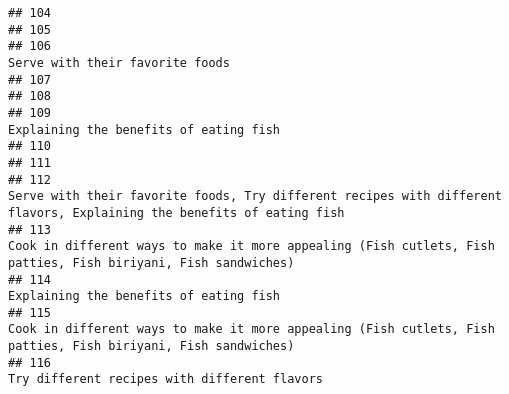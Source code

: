 \documentclass[
]{article}
\begin{document}
\begin{verbatim}
## 104                                                                                                                                                                                                             
## 105                                                                                                                                                                                                             
## 106                                                                                                                                                                              Serve with their favorite foods
## 107                                                                                                                                                                                                             
## 108                                                                                                                                                                                                             
## 109                                                                                                                                                                       Explaining the benefits of eating fish
## 110                                                                                                                                                                                                             
## 111                                                                                                                                                                                                             
## 112                                                                                        Serve with their favorite foods, Try different recipes with different flavors, Explaining the benefits of eating fish
## 113                                                                                                Cook in different ways to make it more appealing (Fish cutlets, Fish patties, Fish biriyani, Fish sandwiches)
## 114                                                                                                                                                                       Explaining the benefits of eating fish
## 115                                                                                                Cook in different ways to make it more appealing (Fish cutlets, Fish patties, Fish biriyani, Fish sandwiches)
## 116                                                                                                                                                                 Try different recipes with different flavors

\end{verbatim}
\end{document}
